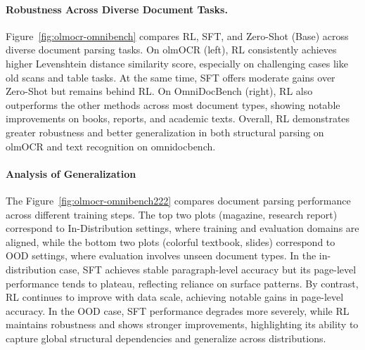 \paragraph{Robustness Across Diverse Document Tasks.} Figure~\ref{fig:olmocr-omnibench} compares RL, SFT, and Zero-Shot (Base) across diverse document parsing tasks. On olmOCR (left), RL consistently achieves higher Levenshtein distance similarity score, especially on challenging cases like old scans and table tasks. At the same time, SFT offers moderate gains over Zero-Shot but remains behind RL. On OmniDocBench (right), RL also outperforms the other methods across most document types, showing notable improvements on books, reports, and academic texts. Overall, RL demonstrates greater robustness and better generalization in both structural parsing on olmOCR and text recognition on omnidocbench.









\paragraph{Analysis of Generalization} 
The Figure~\ref{fig:olmocr-omnibench222} compares document parsing performance across different training steps. The top two plots (magazine, research report) correspond to In-Distribution settings, where training and evaluation domains are aligned, while the bottom two plots (colorful textbook, slides) correspond to OOD settings, where evaluation involves unseen document types. In the in-distribution case, SFT achieves stable paragraph-level accuracy but its page-level performance tends to plateau, reflecting reliance on surface patterns. By contrast, RL continues to improve with data scale, achieving notable gains in page-level accuracy. In the OOD case, SFT performance degrades more severely, while RL maintains robustness and shows stronger improvements, highlighting its ability to capture global structural dependencies and generalize across distributions.





